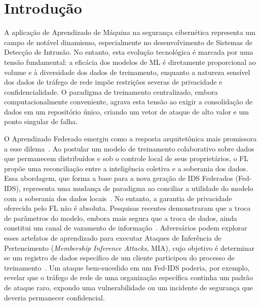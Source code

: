 \documentclass[
	12pt,				%
	openright,			%
	oneside,			%
	a4paper,			%
	english,			%
	french,				%
	spanish,			%
	brazil,				%
	]{abntex2}
\begin{document}

\tableofcontents*
\cleardoublepage



\pagestyle{simple}

\chapter{Introdução}
\label{chap:introducao}

A aplicação de Aprendizado de Máquina na segurança cibernética representa um campo de notável dinamismo, especialmente no desenvolvimento de Sistemas de Detecção de Intrusão. No entanto, esta evolução tecnológica é marcada por uma tensão fundamental: a eficácia dos modelos de ML é diretamente proporcional ao volume e à diversidade dos dados de treinamento, enquanto a natureza sensível dos dados de tráfego de rede impõe restrições severas de privacidade e confidencialidade. O paradigma de treinamento centralizado, embora computacionalmente conveniente, agrava esta tensão ao exigir a consolidação de dados em um repositório único, criando um vetor de ataque de alto valor e um ponto singular de falha.

O Aprendizado Federado emergiu como a resposta arquitetônica mais promissora a esse dilema~\cite{mcmahan2017fedavg}. Ao postular um modelo de treinamento colaborativo sobre dados que permanecem distribuídos e sob o controle local de seus proprietários, o FL propõe uma reconciliação entre a inteligência coletiva e a soberania dos dados. Essa abordagem, que forma a base para a nova geração de IDS Federados (Fed-IDS), representa uma mudança de paradigma ao conciliar a utilidade do modelo com a soberania dos dados locais~\cite{hernandez2023surveyfedids}. No entanto, a garantia de privacidade oferecida pelo FL não é absoluta. Pesquisas recentes demonstraram que a troca de parâmetros do modelo, embora mais segura que a troca de dados, ainda constitui um canal de vazamento de informação~\cite{nasr2019comprehensive}. Adversários podem explorar esses artefatos de aprendizado para executar Ataques de Inferência de Pertencimento (\textit{Membership Inference Attacks}, MIA), cujo objetivo é determinar se um registro de dados específico de um cliente participou do processo de treinamento~\cite{shokri2017mia}. Um ataque bem-sucedido em um Fed-IDS poderia, por exemplo, revelar que o tráfego de rede de uma organização específica continha um padrão de ataque raro, expondo uma vulnerabilidade ou um incidente de segurança que deveria permanecer confidencial.
\end{document}
